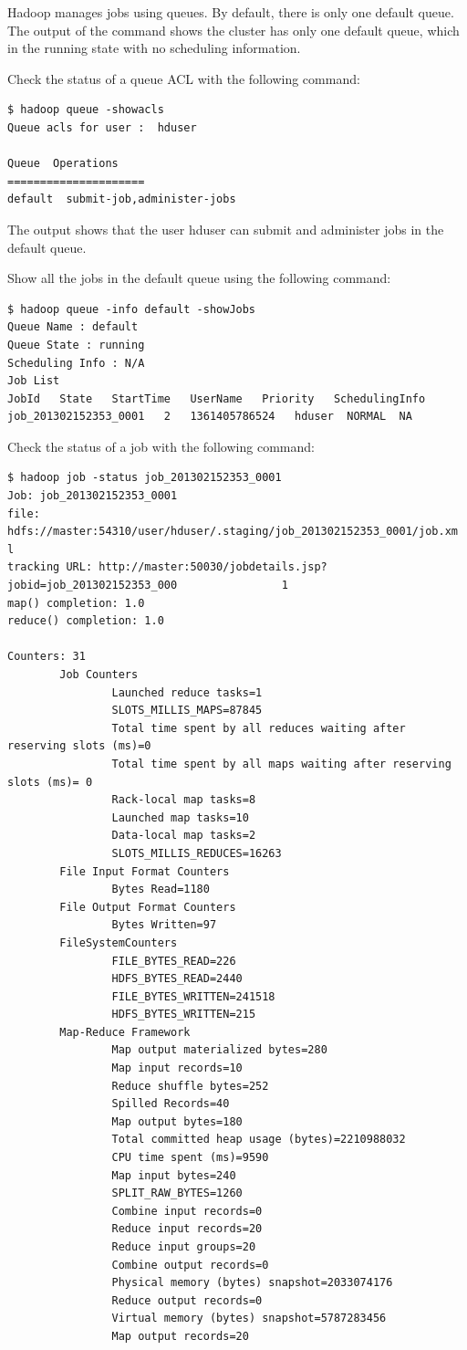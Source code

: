 Hadoop manages jobs using queues. By default, there is only one default queue. The output of the command shows the cluster has only one default queue, which in the running state with no scheduling information.

Check the status of a queue ACL with the following command: 
\begin{verbatim}
$ hadoop queue -showacls
Queue acls for user :  hduser

Queue  Operations
=====================
default  submit-job,administer-jobs
\end{verbatim}

The output shows that the user hduser can submit and administer jobs in the default queue.

Show all the jobs in the default queue using the following command:
\begin{verbatim}
$ hadoop queue -info default -showJobs
Queue Name : default
Queue State : running
Scheduling Info : N/A
Job List
JobId   State   StartTime   UserName   Priority   SchedulingInfo
job_201302152353_0001   2   1361405786524   hduser  NORMAL  NA
\end{verbatim}

Check the status of a job with the following command:
\begin{verbatim}
$ hadoop job -status job_201302152353_0001
Job: job_201302152353_0001
file: hdfs://master:54310/user/hduser/.staging/job_201302152353_0001/job.xm                l
tracking URL: http://master:50030/jobdetails.jsp?jobid=job_201302152353_000                1
map() completion: 1.0
reduce() completion: 1.0

Counters: 31
        Job Counters
                Launched reduce tasks=1
                SLOTS_MILLIS_MAPS=87845
                Total time spent by all reduces waiting after reserving slots (ms)=0
                Total time spent by all maps waiting after reserving slots (ms)= 0
                Rack-local map tasks=8
                Launched map tasks=10
                Data-local map tasks=2
                SLOTS_MILLIS_REDUCES=16263
        File Input Format Counters
                Bytes Read=1180
        File Output Format Counters
                Bytes Written=97
        FileSystemCounters
                FILE_BYTES_READ=226
                HDFS_BYTES_READ=2440
                FILE_BYTES_WRITTEN=241518
                HDFS_BYTES_WRITTEN=215
        Map-Reduce Framework
                Map output materialized bytes=280
                Map input records=10
                Reduce shuffle bytes=252
                Spilled Records=40
                Map output bytes=180
                Total committed heap usage (bytes)=2210988032
                CPU time spent (ms)=9590
                Map input bytes=240
                SPLIT_RAW_BYTES=1260
                Combine input records=0
                Reduce input records=20
                Reduce input groups=20
                Combine output records=0
                Physical memory (bytes) snapshot=2033074176
                Reduce output records=0
                Virtual memory (bytes) snapshot=5787283456
                Map output records=20
\end{verbatim}

